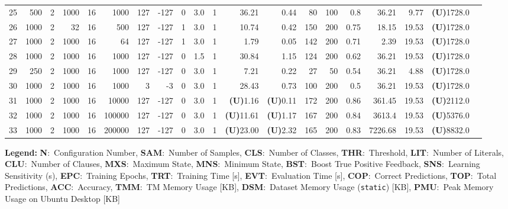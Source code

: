 \begin{table}
\begin{tabular}{@{}r r r r r r r r r r r r r r r r r r r r@{}}
    25 & 500 & 2 & 1000 & 16 & 1000 & 127 & -127 & 0 & 3.0 & 1 & 36.21 & 0.44 & 80 & 100 & 0.8 & 36.21 & 9.77 & \textbf{(U)}1728.0 \\
    26 & 1000 & 2 & 32 & 16 & 500 & 127 & -127 & 1 & 3.0 & 1 & 10.74 & 0.42 & 150 & 200 & 0.75 & 18.15 & 19.53 & \textbf{(U)}1728.0 \\
    27 & 1000 & 2 & 1000 & 16 & 64 & 127 & -127 & 1 & 3.0 & 1 & 1.79 & 0.05 & 142 & 200 & 0.71 & 2.39 & 19.53 & \textbf{(U)}1728.0 \\
    28 & 1000 & 2 & 1000 & 16 & 1000 & 127 & -127 & 0 & 1.5 & 1 & 30.84 & 1.15 & 124 & 200 & 0.62 & 36.21 & 19.53 & \textbf{(U)}1728.0 \\
    29 & 250 & 2 & 1000 & 16 & 1000 & 127 & -127 & 0 & 3.0 & 1 & 7.21 & 0.22 & 27 & 50 & 0.54 & 36.21 & 4.88 & \textbf{(U)}1728.0 \\
    30 & 1000 & 2 & 1000 & 16 & 1000 & 3 & -3 & 0 & 3.0 & 1 & 28.43 & 0.73 & 100 & 200 & 0.5 & 36.21 & 19.53 & \textbf{(U)}1728.0 \\
    31 & 1000 & 2 & 1000 & 16 & 10000 & 127 & -127 & 0 & 3.0 & 1 & \textbf{(U)}1.16 & \textbf{(U)}0.11 & 172 & 200 & 0.86 & 361.45 & 19.53 & \textbf{(U)}2112.0 \\
    32 & 1000 & 2 & 1000 & 16 & 100000 & 127 & -127 & 0 & 3.0 & 1 & \textbf{(U)}11.61 & \textbf{(U)}1.17 & 167 & 200 & 0.84 & 3613.4 & 19.53 & \textbf{(U)}5376.0 \\
    33 & 1000 & 2 & 1000 & 16 & 200000 & 127 & -127 & 0 & 3.0 & 1 & \textbf{(U)}23.00 & \textbf{(U)}2.32 & 165 & 200 & 0.83 & 7226.68 & 19.53 & \textbf{(U)}8832.0 \\ \bottomrule
\end{tabular}
\vspace{1ex}
\begin{flushleft}
\textbf{Legend:} 
\textbf{N}:~Configuration Number,
\textbf{SAM}:~Number of Samples, 
\textbf{CLS}:~Number of Classes, 
\textbf{THR}:~Threshold, 
\textbf{LIT}:~Number of Literals, 
\textbf{CLU}:~Number of Clauses, 
\textbf{MXS}:~Maximum State,
\textbf{MNS}:~Minimum State,
\textbf{BST}:~Boost True Positive Feedback,
\textbf{SNS}:~Learning Sensitivity (s),
\textbf{EPC}:~Training Epochs,
\textbf{TRT}:~Training Time [s],
\textbf{EVT}:~Evaluation Time [s],
\textbf{COP}:~Correct Predictions,
\textbf{TOP}:~Total Predictions,
\textbf{ACC}:~Accuracy,
\textbf{TMM}:~TM Memory Usage [KB],
\textbf{DSM}:~Dataset Memory Usage (\texttt{static}) [KB],
\textbf{PMU}:~Peak Memory Usage on Ubuntu Desktop [KB]
\end{flushleft}
\end{table}

